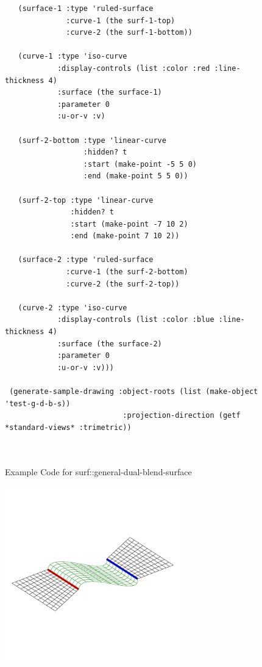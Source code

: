 \documentclass [11pt]{book}
\begin{document}
\begin{itemize}
\begin{figure}
\begin{lrbox}{\boxedverb}
\begin{minipage}{\linewidth}
{\begin{verbatim}
   (surface-1 :type 'ruled-surface
              :curve-1 (the surf-1-top)
              :curve-2 (the surf-1-bottom))
    
   (curve-1 :type 'iso-curve
            :display-controls (list :color :red :line-thickness 4)
            :surface (the surface-1)
            :parameter 0
            :u-or-v :v)
    
   (surf-2-bottom :type 'linear-curve
                  :hidden? t
                  :start (make-point -5 5 0)
                  :end (make-point 5 5 0))
    
   (surf-2-top :type 'linear-curve
               :hidden? t
               :start (make-point -7 10 2)
               :end (make-point 7 10 2))
    
   (surface-2 :type 'ruled-surface
              :curve-1 (the surf-2-bottom)
              :curve-2 (the surf-2-top))
    
   (curve-2 :type 'iso-curve
            :display-controls (list :color :blue :line-thickness 4)
            :surface (the surface-2)
            :parameter 0
            :u-or-v :v)))

 (generate-sample-drawing :object-roots (list (make-object 'test-g-d-b-s))
                           :projection-direction (getf *standard-views* :trimetric))

 
\end{verbatim}}
\end{minipage}
\end{lrbox}
\fbox{\usebox{\boxedverb}}

\caption{Example Code for surf::general-dual-blend-surface}

\label{fig:example-code-surf::general-dual-blend-surface}

\end{figure}

\begin{figure}
\begin{center}
\includegraphics[width=3in,height=3in]{../images/example-surf::general-dual-blend-surface.pdf}
\end{center}


\end{figure}
\end{itemize}
\end{document}
